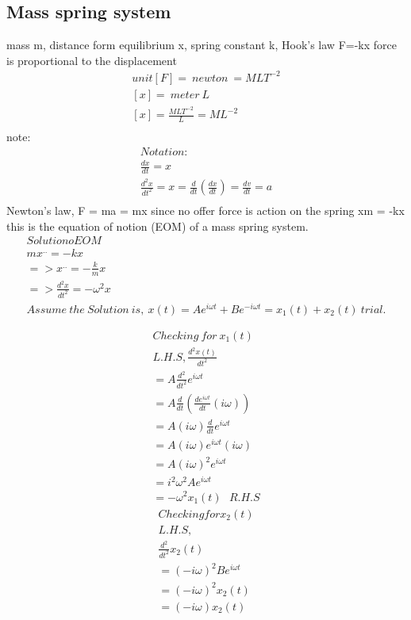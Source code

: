\subsection{Mass spring system}
	mass m,
	distance form equilibrium x,
	spring constant k,
	Hook's law  F=-kx
	force is proportional to the displacement
	\begin{align}
		unit [F] = \ newton \ = MLT^{-2} \\
		[x] = \ meter \ L \\
		[x] = \frac{MLT^{-2}}{L} = ML^{-2} \\
	\end{align}
	note:
	\begin{align}
		Notation: \\
		\frac{dx}{dt} = x \\
		\frac{d^2x}{dt^2} = x = \frac{d}{dt}(\frac{dx}{dt}) = \frac{dv}{dt} = a \\
	\end{align}
	Newton's law, F = ma = mx %
	since no offer force is action on the spring xm = -kx  %
	this is the equation of notion (EOM) of a mass spring system.
	\begin{align}
		Solution o EOM \\
		mx^{..} = -kx \\
		=> x^{..} = -\frac{k}{m}x \\
		=> \frac{d^2x}{dt^2} = -\omega^2x \\
		Assume \  the \ Solution \ is, \ x(t) = Ae^{i\omega t}+ Be^{-i\omega t} = x_1(t)+x_2(t) \ trial. \\
		\\
	\end{align}
	\begin{align}
		Checking \ for \ x_1(t) \\
		L.H.S,
		\frac{d^2x(t)}{dt^2} \\
		= A	\frac{d^2}{dt^2}e^{i\omega t} \\
		= A \frac{d}{dt}(\frac{de^{i\omega t}}{dt}(i\omega)) \\
		= A(i\omega) \frac{d}{dt}e^{i\omega t }\\
		= A(i \omega) e^{i\omega t}(i\omega) \\
		= A(i\omega)^2 e^{i\omega t} \\
		= i^2\omega^2 Ae^{i\omega t} \\
		= -\omega^2 x_1(t) \ \ \ R.H.S
	\end{align}
	\begin{align}
		Checking for x_2(t) \\
		L.H.S, \\
		\frac{d^2}{dt^2}x_2	(t)	 \\
		= (-i \omega)^2 Be^{i\omega t} \\
		= (-i \omega)^2 x_2(t) \\
		= (-i\omega) x_2(t) \\
	\end{align}
